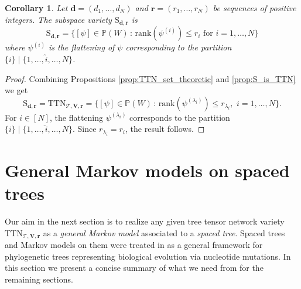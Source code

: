 \documentclass[12pt]{article}
\newtheorem{corollary}[theorem]{Corollary}
\theoremstyle{definition}
\numberwithin{theorem}{section}
\newcommand{\PP}{\mathbb{P}}
\begin{document}
\begin{corollary}\label{cor: S flattening}
Let $\mathbf d=(d_1,\ldots,d_N)$ and $\mathbf{r} = (r_1, \ldots,r_N)$ be sequences of positive integers. The subspace variety $\mathrm{S}_{\mathbf{d}, \mathbf{r}}$ is
 $$ \mathrm{S}_{\mathbf{d}, \mathbf{r}} = \{ [\psi] \in \PP(W) \, :\, \mathrm{rank}(\psi^{(i)}) \leq r_i \mbox{ for } i=1,\ldots, N\}$$
 where $\psi^{(i)}$ is the flattening of $\psi$ corresponding to the partition $\{i\} \mid \{1, \ldots, \widehat{i}, \ldots, N\}$.
\end{corollary}
\begin{proof}
Combining Propositions \ref{prop:TTN_set_theoretic} and  
\ref{prop:S_is_TTN} we get
$$ \mathrm{S}_{\mathbf{d}, \mathbf{r}} = \mathrm{TTN}_{\mathscr{T}, \mathbf{V},\mathbf{r}} = \{ [\psi] \in \PP(W) \, : \, \mathrm{rank}(\psi^{(\lambda_i)}) \leq r_{\lambda_i}, \,\, i=1, \ldots, N\}.
$$
For $i \in [N]$, the flattening $\psi^{(\lambda_i)}$ corresponds to the partition $\{i\} \mid \{1, \ldots, \widehat{i}, \ldots, N\}$. Since $r_{\lambda_i} = r_i$, the result follows.
\end{proof}
\section{General Markov models on spaced trees} \label{sec:spaced trees}
Our aim in the next section is to realize any given tree tensor network variety $\mathrm{TTN}_{\mathscr T, \mathbf{V}, \mathbf{r}}$ as a {\it general Markov model} associated to a {\it spaced tree}. Spaced trees and Markov models on them were treated in \cite{DK09} as a general framework for phylogenetic trees representing biological evolution via nucleotide mutations. In this section we present a concise summary of what we need from \cite{DK09} for the remaining sections.
\end{document}
